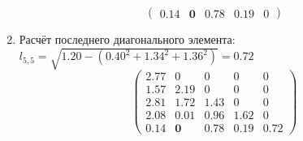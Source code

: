 \begin{multicols}{3}
\begin{enumerate}
$$\begin{pmatrix}
        0.14 &  \mathbf{0}     & 0.78 & 0.19 & 0
    \end{pmatrix}$$
    \vspace{-0.5cm}
    \item Расчёт последнего диагонального элемента: $l_{5,5} = \sqrt{1.20 - (0.40^2+1.34^2+1.36^2)} = 0.72$
    $$\begin{pmatrix}
        2.77 & 0     & 0    & 0    & 0    \\
        1.57 & 2.19  & 0    & 0    & 0    \\
        2.81 & 1.72  & 1.43 & 0    & 0    \\
        2.08 & 0.01  & 0.96 & 1.62 & 0    \\
        0.14 &  \mathbf{0}     & 0.78 & 0.19 & 0.72
    \end{pmatrix}$$
    \end{enumerate}



\end{multicols}
